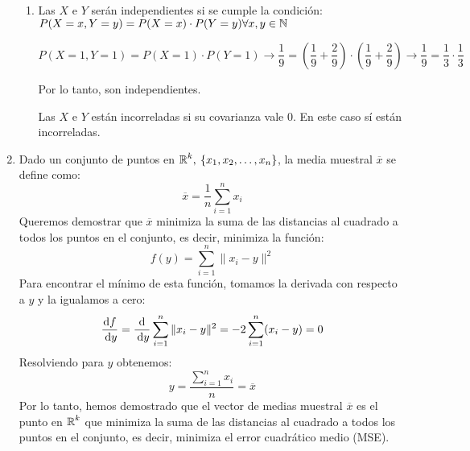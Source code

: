 \begin{enumerate}[label=\color{red}\arabic*), leftmargin=*]
\begin{enumerate}[label=\color{red}\alph*)]
		\item {}
		
		Las \vas $X$ e $Y$ serán independientes si se cumple la condición: $P(X=x,Y=y)=P(X=x)\cdot P(Y=y)\forall x,y\in\operatorname{\mathbb{N}}$
		
		$P(X=1,Y=1)=P(X=1)\cdot P(Y=1)\longrightarrow \dfrac{1}{9}=\left(\dfrac{1}{9}+\dfrac{2}{9}\right)\cdot\left(\dfrac{1}{9}+\dfrac{2}{9}\right)\longrightarrow\dfrac{1}{9}=\dfrac{1}{3}\cdot\dfrac{1}{3}$
		
		Por lo tanto, son independientes.
		
		Las \vas $X$ e $Y$ están incorreladas si su covarianza vale 0. En este caso sí están incorreladas.
	\end{enumerate}
	\item {}
	
	Dado un conjunto de puntos en $\operatorname{\mathbb{R}}^k,\:\{x_1,x_2,\dots,x_n\}$, la media muestral $\overline{x}$ se define como: \[ \overline{x}=\dfrac{1}{n}\sum_{i=1}^{n}x_i \]Queremos demostrar que $\overline{x}$ minimiza la suma de las distancias al cuadrado a todos los puntos en el conjunto, es decir, minimiza la función: \[ f(y)=\sum_{i=1}^{n}\|x_i-y\|^2 \]Para encontrar el mínimo de esta función, tomamos la derivada con respecto a $y$ y la igualamos a cero: \[ \dfrac{\mathrm{d}f}{\:\mathrm{d}y}=\dfrac{\mathrm{d}}{\:\mathrm{d}y}\sum_{i=1}^{n}\|x_i-y\|^2=-2\sum_{i=1}^{n}(x_i-y)=0 \]Resolviendo para $y$ obtenemos: \[ y=\dfrac{\displaystyle \sum_{i=1}^{n}x_i}{n}=\overline{x} \]Por lo tanto, hemos demostrado que el vector de medias muestral $\overline{x}$ es el punto en $\operatorname{\mathbb{R}}^k$ que minimiza la suma de las distancias al cuadrado a todos los puntos en el conjunto, es decir, minimiza el error cuadrático medio (MSE).
\end{enumerate}